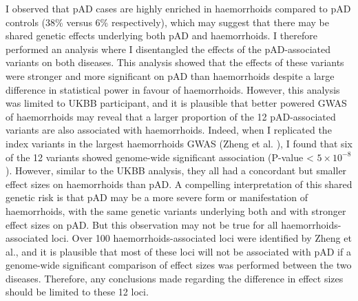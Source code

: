 I observed that pAD cases are highly enriched in haemorrhoids compared to pAD controls (38\% versus 6\% respectively), which may suggest that there may be shared genetic effects underlying both pAD and haemorrhoids. I therefore performed an analysis where I disentangled the effects of the pAD-associated variants on both diseases. This analysis showed that the effects of these variants were stronger and more significant on pAD than haemorrhoids despite a large difference in statistical power in favour of haemorrhoids. However, this analysis was limited to UKBB participant, and it is plausible that better powered GWAS of haemorrhoids may reveal that a larger proportion of the 12 pAD-associated variants are also associated with haemorrhoids. Indeed, when I replicated the index variants in the largest haemorrhoids GWAS (Zheng et al. \cite{Zheng2021-ss}), I found that six of the 12 variants showed genome-wide significant association (P-value < $5\times10^{-8}$). However, similar to the UKBB analysis, they all had a concordant but smaller effect sizes on haemorrhoids than pAD. A compelling interpretation of this shared genetic risk is that pAD may be a more severe form or manifestation of haemorrhoids, with the same genetic variants underlying both and with stronger effect sizes on pAD. But this observation may not be true for all haemorrhoids-associated loci. Over 100 haemorrhoids-associated loci were identified by Zheng et al., and it is plausible that most of these loci will not be associated with pAD if a genome-wide significant comparison of effect sizes was performed between the two diseases. Therefore, any conclusions made regarding the difference in effect sizes should be limited to these 12 loci.\\

